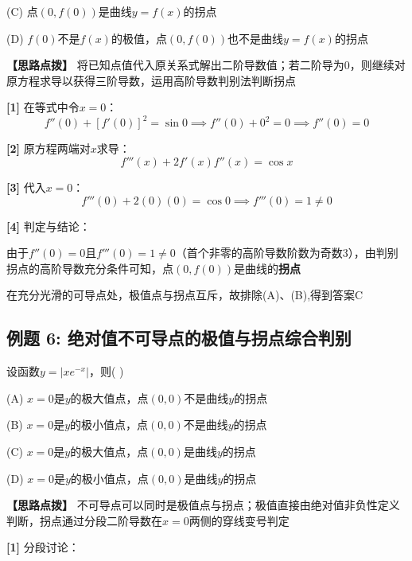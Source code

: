 \documentclass[11pt,a4paper,UTF8]{ctexart}
\begin{document}
(C) 点$(0, f(0))$是曲线$y = f(x)$的拐点

(D) $f(0)$不是$f(x)$的极值，点$(0, f(0))$也不是曲线$y = f(x)$的拐点

\textbf{\color{DeepPurple}【思路点拨】} 将已知点值代入原关系式解出二阶导数值；若二阶导为0，则继续对原方程求导以获得三阶导数，运用高阶导数判别法判断拐点


\begin{solbox}[分步推导与答题规范]
\textbf{[1]} 在等式中令$x = 0$：
\begin{equation*}
f''(0) + [f'(0)]^2 = \sin 0 \implies f''(0) + 0^2 = 0 \implies f''(0) = 0
\end{equation*}


\textbf{[2]} 原方程两端对$x$求导：
\begin{equation*}
f'''(x) + 2f'(x)f''(x) = \cos x
\end{equation*}


\textbf{[3]} 代入$x = 0$：
\begin{equation*}
f'''(0) + 2(0)(0) = \cos 0 \implies f'''(0) = 1 \neq 0
\end{equation*}


\textbf{[4]} 判定与结论：

由于$f''(0) = 0$且$f'''(0) = 1 \neq 0$（首个非零的高阶导数阶数为奇数3），由判别拐点的高阶导数充分条件可知，点$(0, f(0))$是曲线的\textbf{拐点}

在充分光滑的可导点处，极值点与拐点互斥，故排除(A)、(B),得到答案C

\end{solbox}


\subsection{例题 6: 绝对值不可导点的极值与拐点综合判别}

设函数$y = \vert{}xe^{-x}\vert{}$，则( )

(A) $x = 0$是$y$的极大值点，点$(0, 0)$不是曲线$y$的拐点

(B) $x = 0$是$y$的极小值点，点$(0, 0)$不是曲线$y$的拐点

(C) $x = 0$是$y$的极大值点，点$(0, 0)$是曲线$y$的拐点

(D) $x = 0$是$y$的极小值点，点$(0, 0)$是曲线$y$的拐点

\textbf{\color{DeepPurple}【思路点拨】} 不可导点可以同时是极值点与拐点；极值直接由绝对值非负性定义判断，拐点通过分段二阶导数在$x=0$两侧的穿线变号判定


\textbf{[1]} 分段讨论：
\end{document}
